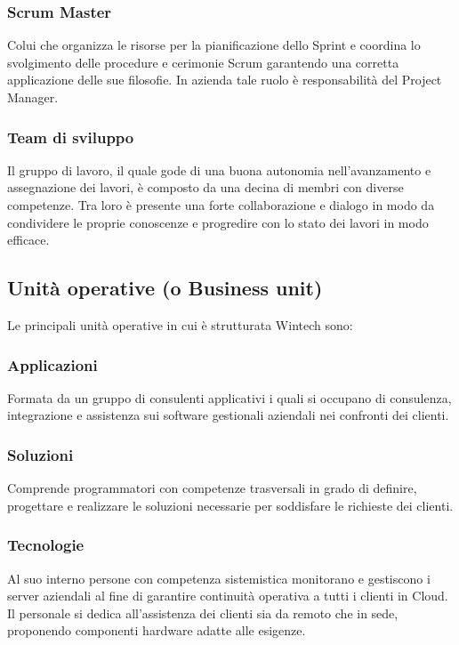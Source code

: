 \subsubsection*{Scrum Master}
Colui che organizza le risorse per la pianificazione dello Sprint e coordina lo svolgimento delle procedure e cerimonie Scrum garantendo una corretta applicazione delle sue filosofie.
In azienda tale ruolo è responsabilità del Project Manager. 

\subsubsection*{Team di sviluppo}
Il gruppo di lavoro, il quale gode di una buona autonomia nell'avanzamento e assegnazione dei lavori, è composto da una decina di membri con diverse competenze.  Tra loro è presente una forte collaborazione e dialogo in modo da condividere le proprie conoscenze e progredire con lo stato dei lavori in modo efficace. 


\subsection{Unità operative (o Business unit)}
Le principali unità operative in cui è strutturata Wintech sono:

\subsubsection*{Applicazioni}
Formata da un gruppo di consulenti applicativi i quali si occupano di consulenza, integrazione e assistenza sui software gestionali aziendali nei confronti dei clienti. 

\subsubsection*{Soluzioni}
Comprende programmatori con competenze trasversali in grado di definire, progettare e realizzare le soluzioni necessarie per soddisfare le richieste dei clienti. 

\subsubsection*{Tecnologie}
Al suo interno persone con competenza sistemistica monitorano e gestiscono i server aziendali al fine di garantire continuità operativa a tutti i clienti in Cloud. Il personale si dedica all'assistenza dei clienti sia da remoto che in sede, proponendo componenti hardware adatte alle esigenze. 

